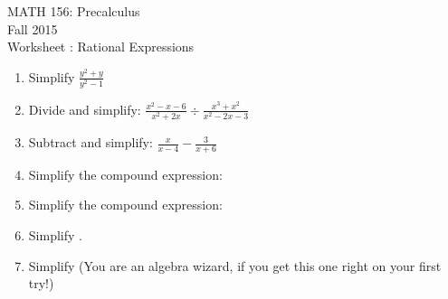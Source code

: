 \documentclass[11pt]{article}
\newcommand{\sect}{\textsection}
\begin{document}
 

\begin{center}MATH 156: Precalculus  \\ Fall 2015 \\ Worksheet \sect 1.4: Rational Expressions \end{center}

\hrulefill

\begin{enumerate}
\item Simplify $\displaystyle{\frac{y^2+y}{y^2-1}}$
\vfill
\item Divide and simplify: $\displaystyle{\frac{x^2-x-6}{x^2+2x}\div\frac{x^3+x^2}{x^2-2x-3}}$
\vfill
\item Subtract and simplify: $\displaystyle{\frac{x}{x-4}-\frac{3}{x+6}}$
\vfill
\newpage
\item Simplify the compound expression: 
\vfill
\item Simplify the compound expression: 
\vfill
\item Simplify .
\vfill
\item Simplify  (You are an algebra wizard, if you get this one right on your first try!) 
\end{enumerate}
\end{document}
